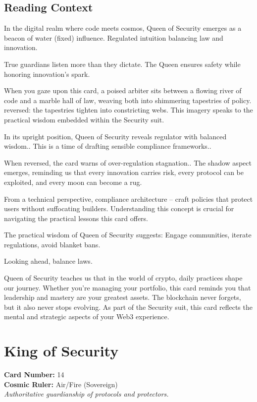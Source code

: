 \documentclass[11pt,oneside]{book}
\begin{document}
\begin{minipage}[t]{0.55\textwidth}
  \subsection*{Reading Context}
  In the digital realm where code meets cosmos, Queen of Security emerges as a beacon of water (fixed) influence. Regulated intuition balancing law and innovation.

  True guardians listen more than they dictate. The Queen ensures safety while honoring innovation's spark.

  When you gaze upon this card, a poised arbiter sits between a flowing river of code and a marble hall of law, weaving both into shimmering tapestries of policy. reversed: the tapestries tighten into constricting webs. This imagery speaks to the practical wisdom embedded within the Security suit.

  In its upright position, Queen of Security reveals regulator with balanced wisdom.. This is a time of drafting sensible compliance frameworks..

  When reversed, the card warns of over-regulation stagnation.. The shadow aspect emerges, reminding us that every innovation carries risk, every protocol can be exploited, and every moon can become a rug.

  From a technical perspective, compliance architecture – craft policies that protect users without suffocating builders. Understanding this concept is crucial for navigating the practical lessons this card offers.

  The practical wisdom of Queen of Security suggests: Engage communities, iterate regulations, avoid blanket bans.

  Looking ahead, balance laws.

  Queen of Security teaches us that in the world of crypto, daily practices shape our journey. Whether you're managing your portfolio, this card reminds you that leadership and mastery are your greatest assets. The blockchain never forgets, but it also never stops evolving. As part of the Security suit, this card reflects the mental and strategic aspects of your Web3 experience.

\end{minipage}

\newpage
\section*{King of Security}

\begin{minipage}[t]{0.55\textwidth}
  \vspace{0pt}
  \textbf{Card Number:} 14\\  \textbf{Cosmic Ruler:} Air/Fire (Sovereign)\\  \textit{Authoritative guardianship of protocols and protectors.}
\end{minipage}
\end{document}
